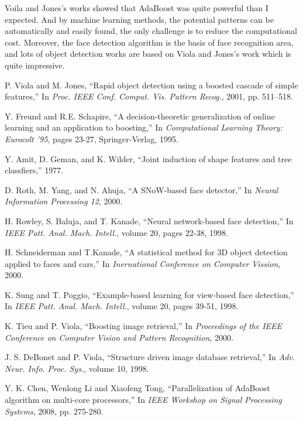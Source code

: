 \documentclass[10pt,twocolumn,letterpaper]{article}
\begin{document}
Voila and Jones's works showed that AdaBoost was quite powerful than I expected.
And by machine learning methods, the potential patterns can be automatically and easily found,
the only challenge is to reduce the computational cost.
Moreover, the face detection algorithm is the basis of face recognition area,
and lots of object detection works are based on Viola and Jones's work which is quite impressive.


\begin{thebibliography}{99}
P. Viola and M. Jones, ``Rapid object detection using a boosted cascade of simple features,''
In \textit{Proc. IEEE Conf. Comput. Vis. Pattern Recog.}, 2001, pp. 511–518.

Y. Freund and R.E. Schapire, ``A decision-theoretic generalization of online learning and an application to boosting,''
In \textit{Computational Learning Theory: Eurocolt '95}, pages 23-27, Springer-Verlag, 1995.

Y. Amit, D. Geman, and K. Wilder, ``Joint induction of shape features and tree classfiers,'' 1977.

D. Roth, M. Yang, and N. Ahuja, ``A SNoW-based face detector,''
In \textit{Neural Information Processing 12}, 2000.

H. Rowley, S. Baluja, and T. Kanade, ``Neural network-based face detection,''
In \textit{IEEE Patt. Anal. Mach. Intell.}, volume 20, pages 22-38, 1998.

H. Schneiderman and T.Kanade, ``A statistical method for 3D object detection applied to faces and cars,''
In \textit{Inernational Conference on Computer Vission}, 2000.

K. Sung and T. Poggio, ``Example-based learning for view-based face detection,''
In \textit{IEEE Patt. Anal. Mach. Intell.}, volume 20, pages 39-51, 1998.

K. Tieu and P. Viola, ``Boosting image retrieval,''
In \textit{Proceedings of the IEEE Conference on Computer Vision and Pattern Recognition}, 2000.

J. S. DeBonet and P. Viola, ``Structure driven image database retrieval,''
In \textit{Adv. Neur. Info. Proc. Sys.}, volume 10, 1998.

Y. K. Chen, Wenlong Li and Xiaofeng Tong, ``Parallelization of AdaBoost algorithm on multi-core processors,''
In \textit{IEEE Workshop on Signal Processing Systems}, 2008, pp. 275-280.


\end{thebibliography}
\end{document}
